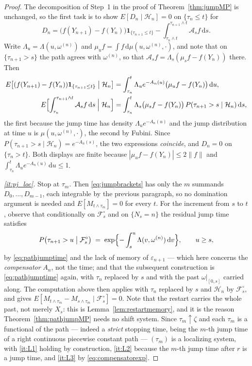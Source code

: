 \documentclass[11pt,a4paper]{article}
\theoremstyle{plain}
\theoremstyle{definition}
\theoremstyle{remark}
\newcommand{\Filt}{\mathcal{F}}
\newcommand{\one}{\mathbf{1}}
\newcommand{\dif}{\,\mathrm{d}}
\begin{document}
\begin{proof}
  The decomposition of Step~1 in the proof of Theorem~\ref{thm:jumpMP} is
  unchanged, so the first task is to show $E[D_n \mid \mathcal{H}_n] = 0$ on
  $\{\tau_n \leq t\}$ for
  \[
    D_n = \bigl( f(Y_{n+1}) - f(Y_n) \bigr)\one_{\{\tau_{n+1}\leq t\}}
        - \int_{\tau_n \wedge t}^{\tau_{n+1}\wedge t} \mathcal{A}_s f \dif s .
  \]
  Write $\Lambda_u = \Lambda(u,\omega^{(n)})$ and
  $\mu_u f = \int f \dif\mu(u,\omega^{(n)},\cdot)$, and note that on
  $\{\tau_{n+1} > s\}$ the path agrees with $\omega^{(n)}$, so that
  $\mathcal{A}_s f = \Lambda_s(\mu_s f - f(Y_n))$ there.  Then
  \begin{align*}
    E\bigl[ (f(Y_{n+1}) - f(Y_n))\one_{\{\tau_{n+1}\leq t\}} \bigm| \mathcal{H}_n \bigr]
      &= \int_{\tau_n}^{t} \Lambda_u e^{-A_n(u)}
         \bigl( \mu_u f - f(Y_n) \bigr) \dif u , \\
    E\Bigl[ \int_{\tau_n}^{\tau_{n+1}\wedge t} \mathcal{A}_s f \dif s
      \Bigm| \mathcal{H}_n \Bigr]
      &= \int_{\tau_n}^{t} \Lambda_s \bigl( \mu_s f - f(Y_n) \bigr)
         \, P(\tau_{n+1} > s \mid \mathcal{H}_n) \dif s ,
  \end{align*}
  the first because the jump time has density $\Lambda_u e^{-A_n(u)}$ and the jump
  distribution at time $u$ is $\mu(u,\omega^{(n)},\cdot)$, the second by Fubini.
  Since $P(\tau_{n+1}>s\mid\mathcal{H}_n) = e^{-A_n(s)}$, the two expressions
  \emph{coincide}, and $D_n = 0$ on $\{\tau_n > t\}$.  Both displays are finite
  because $|\mu_uf - f(Y_n)| \leq 2\lVert f\rVert$ and
  $\int_{\tau_n}^{t}\Lambda_u e^{-A_n(u)}\dif u \leq 1$.

  \emph{\ref{it:pj_loc}.}  Stop at $\tau_m$.  Then
  \eqref{eq:jumpbrackets} has only the $m$ summands $D_0,\dots,D_{m-1}$, each
  integrable by the previous paragraph, so no domination argument is needed and
  $E[M_{t\wedge\tau_m}] = 0$ for every $t$.  For the increment from $s$ to $t$,
  observe that conditionally on $\Filt^\circ_s$ and on $\{N_s = n\}$ the residual
  jump time satisfies
  \[
    P\bigl( \tau_{n+1} > u \bigm| \Filt^\circ_s \bigr)
      \;=\; \exp\Bigl\{ -\int_s^u \Lambda(v,\omega^{(n)}) \dif v \Bigr\} ,
    \qquad u \geq s ,
  \]
  by \eqref{eq:pathjumptime} and the lack of memory of $\varepsilon_{n+1}$ ---
  which here concerns the \emph{compensator} $A_n$, not the time; and that the
  subsequent construction is \eqref{eq:pathjumptime} again, with $\tau_n$ replaced
  by $s$ and with the past $\omega|_{[0,s]}$ carried along.  The computation above
  then applies with $\tau_n$ replaced by $s$ and $\mathcal{H}_n$ by
  $\Filt^\circ_s$, and gives $E[M_{t\wedge\tau_m} - M_{s\wedge\tau_m} \mid
  \Filt^\circ_s] = 0$.  Note that the restart carries the whole past, not merely
  $X_s$: this is Lemma~\ref{lem:restartmemory}, and it is the reason
  Theorem~\ref{thm:pathjumpMP} needs no shift system.  Since
  $\tau_m \uparrow \zeta$ and each $\tau_m$ is a functional of the path ---
  indeed a \emph{strict} stopping time, being the $m$-th jump time of a right
  continuous piecewise constant path --- $(\tau_m)$ is a localizing system, with
  \ref{it:L1} holding by construction, \ref{it:L2} because the $m$-th jump time
  after $r$ is a jump time, and \ref{it:L3} by \eqref{eq:compensatorexp}.


\end{proof}
\end{document}
